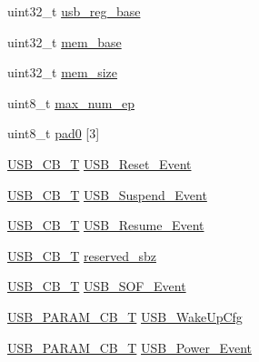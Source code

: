 \begin{DoxyCompactItemize}
\item 
uint32\-\_\-t \hyperlink{structUSBD__API__INIT__PARAM_a171d80187485a767c4fdf4dc4c4f330a}{usb\-\_\-reg\-\_\-base}
\item 
uint32\-\_\-t \hyperlink{structUSBD__API__INIT__PARAM_ac3209246722c2395c476c82d0e76c879}{mem\-\_\-base}
\item 
uint32\-\_\-t \hyperlink{structUSBD__API__INIT__PARAM_a237d34b2303d35b80c7ebb9c58326bf9}{mem\-\_\-size}
\item 
uint8\-\_\-t \hyperlink{structUSBD__API__INIT__PARAM_a168996cbd91b47939fe823bf0bf7cbe0}{max\-\_\-num\-\_\-ep}
\item 
uint8\-\_\-t \hyperlink{structUSBD__API__INIT__PARAM_ab537ed0a84e63aaf79592e8bd500c79c}{pad0} \mbox{[}3\mbox{]}
\item 
\hyperlink{group__USBD__Core_ga0404ce046312aa5c798cc4a05c417e46}{U\-S\-B\-\_\-\-C\-B\-\_\-\-T} \hyperlink{structUSBD__API__INIT__PARAM_a49f0d2a8b163486e07cfea83b436234f}{U\-S\-B\-\_\-\-Reset\-\_\-\-Event}
\item 
\hyperlink{group__USBD__Core_ga0404ce046312aa5c798cc4a05c417e46}{U\-S\-B\-\_\-\-C\-B\-\_\-\-T} \hyperlink{structUSBD__API__INIT__PARAM_a3c256417cf3bdd576029d29787d6046f}{U\-S\-B\-\_\-\-Suspend\-\_\-\-Event}
\item 
\hyperlink{group__USBD__Core_ga0404ce046312aa5c798cc4a05c417e46}{U\-S\-B\-\_\-\-C\-B\-\_\-\-T} \hyperlink{structUSBD__API__INIT__PARAM_a2fb170236fa92a20f29dc8c13b24a1d1}{U\-S\-B\-\_\-\-Resume\-\_\-\-Event}
\item 
\hyperlink{group__USBD__Core_ga0404ce046312aa5c798cc4a05c417e46}{U\-S\-B\-\_\-\-C\-B\-\_\-\-T} \hyperlink{structUSBD__API__INIT__PARAM_a8470d3c0f29b31408ffa46dd4a4bd74a}{reserved\-\_\-sbz}
\item 
\hyperlink{group__USBD__Core_ga0404ce046312aa5c798cc4a05c417e46}{U\-S\-B\-\_\-\-C\-B\-\_\-\-T} \hyperlink{structUSBD__API__INIT__PARAM_af6f224a6b2ddee3c5b2056a62fa84914}{U\-S\-B\-\_\-\-S\-O\-F\-\_\-\-Event}
\item 
\hyperlink{group__USBD__Core_ga7df622c61ebb152b83dd5972ac789b28}{U\-S\-B\-\_\-\-P\-A\-R\-A\-M\-\_\-\-C\-B\-\_\-\-T} \hyperlink{structUSBD__API__INIT__PARAM_a3166b630a5aa02ca07bd3df8496aba5b}{U\-S\-B\-\_\-\-Wake\-Up\-Cfg}
\item 
\hyperlink{group__USBD__Core_ga7df622c61ebb152b83dd5972ac789b28}{U\-S\-B\-\_\-\-P\-A\-R\-A\-M\-\_\-\-C\-B\-\_\-\-T} \hyperlink{structUSBD__API__INIT__PARAM_af2aaf61b6e8ada6c2d50b61d516e2db6}{U\-S\-B\-\_\-\-Power\-\_\-\-Event}

\end{DoxyCompactItemize}

